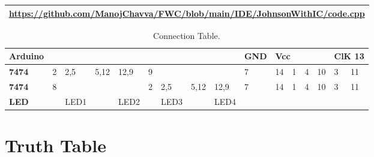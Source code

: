 \documentclass[journal,12pt,twocolumn]{IEEEtran}
\begin{document}
\newpage

\begin{table}[h]
\large
\centering
\begin{tabular}{|l|}
\hline

\url{https://github.com/ManojChavva/FWC/blob/main/IDE/JohnsonWithIC/code.cpp} \\
\hline

\end{tabular}

\end{table}


\begin{table}[h]
\large
\centering

\begin{tabular}{|l|l|l|l|l|l|l|l|l|l|llll|ll|}
\hline
\textbf{Arduino} &   &      &      &      &   &      &      &      & GND & \multicolumn{4}{l|}{Vcc}                                                       & \multicolumn{2}{l|}{ClK  13} \\ \hline
\textbf{7474}    & 2 & 2,5  & 5,12 & 12,9 & 9 &      &      &      & 7   & \multicolumn{1}{l|}{14} & \multicolumn{1}{l|}{1} & \multicolumn{1}{l|}{4} & 10 & \multicolumn{1}{l|}{3}  & 11 \\ \hline
\textbf{7474}    & 8 &      &      &      & 2 & 2,5  & 5,12 & 12,9 & 7   & \multicolumn{1}{l|}{14} & \multicolumn{1}{l|}{1} & \multicolumn{1}{l|}{4} & 10 & \multicolumn{1}{l|}{3}  & 11 \\ \hline
\textbf{LED}     &   & LED1 &      & LED2 &   & LED3 &      & LED4 &     & \multicolumn{1}{l|}{}   & \multicolumn{1}{l|}{}  & \multicolumn{1}{l|}{}  &    & \multicolumn{1}{l|}{}   &    \\ \hline
\end{tabular}

\caption{Connection Table.}
\label{table:1}
\end{table}


\section{Truth Table}
\end{document}
